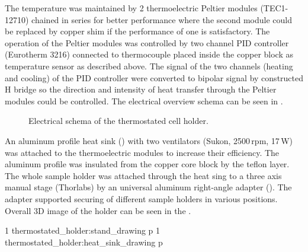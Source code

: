 The temperature was maintained by 2 thermoelectric Peltier modules (TEC1-12710)
chained in series for better performance where the second module could be
replaced by copper shim if the performance of one is satisfactory. The
operation of the Peltier modules was controlled by two channel PID controller
(Eurotherm 3216) connected to thermocouple placed inside the copper block as
temperature sensor as described above. The signal of the two channels (heating
and cooling) of the PID controller were converted to bipolar signal by
constructed H bridge so the direction and intensity of heat transfer through
the Peltier modules could be controlled. The electrical overview schema can be
seen in .

\begin{figure}
	\centering
	
	\caption{Electrical schema of the thermostated cell holder.}
	\label{\figlabel{thermostated_holder:electrical_schema}}
\end{figure}

An aluminum profile heat sink
()
with two ventilators (Sukon, 2500\,rpm, 17\,W) was attached to the
thermoelectric modules to increase their efficiency. The aluminum profile was
insulated from the copper core block by the teflon layer. The whole sample
holder was attached through the heat sing to a three axis manual stage
(Thorlabs) by an universal aluminum right-angle adapter
().
The adapter supported securing of different sample holders in various
positions. Overall 3D image of the holder can be seen in the
.

%
{1}%
{thermostated_holder:stand_drawing}
{p}
%
{1}%
{thermostated_holder:heat_sink_drawing}
{p}

